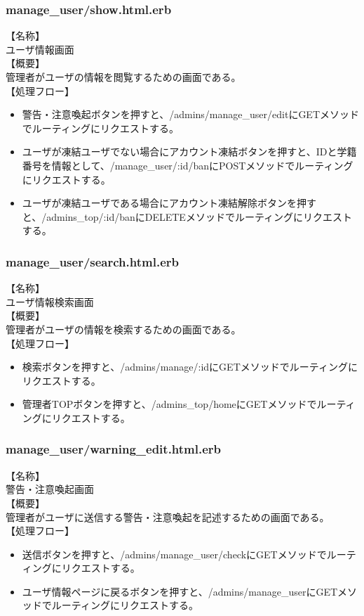 \documentclass[a4j]{jarticle}
\begin{document}
\subsubsection{manage\_user/show.html.erb}
\noindent
【名称】\\
ユーザ情報画面\\
【概要】\\
管理者がユーザの情報を閲覧するための画面である。\\
【処理フロー】
\begin{itemize}
  \item 警告・注意喚起ボタンを押すと、/admins/manage\_user/editにGETメソッドでルーティングにリクエストする。
  \item ユーザが凍結ユーザでない場合にアカウント凍結ボタンを押すと、IDと学籍番号を情報として、/manage\_user/:id/banにPOSTメソッドでルーティングにリクエストする。
  \item ユーザが凍結ユーザである場合にアカウント凍結解除ボタンを押すと、/admins\_top/:id/banにDELETEメソッドでルーティングにリクエストする。
\end{itemize}

\subsubsection{manage\_user/search.html.erb}
\noindent
【名称】\\
ユーザ情報検索画面\\
【概要】\\
管理者がユーザの情報を検索するための画面である。\\
【処理フロー】
\begin{itemize}
  \item 検索ボタンを押すと、/admins/manage/:idにGETメソッドでルーティングにリクエストする。
  \item 管理者TOPボタンを押すと、/admins\_top/homeにGETメソッドでルーティングにリクエストする。
\end{itemize}

\subsubsection{manage\_user/warning\_edit.html.erb}
\noindent
【名称】\\
警告・注意喚起画面\\
【概要】\\
管理者がユーザに送信する警告・注意喚起を記述するための画面である。\\
【処理フロー】
\begin{itemize}
  \item 送信ボタンを押すと、/admins/manage\_user/checkにGETメソッドでルーティングにリクエストする。
  \item ユーザ情報ページに戻るボタンを押すと、/admins/manage\_userにGETメソッドでルーティングにリクエストする。
\end{itemize}
\end{document}
